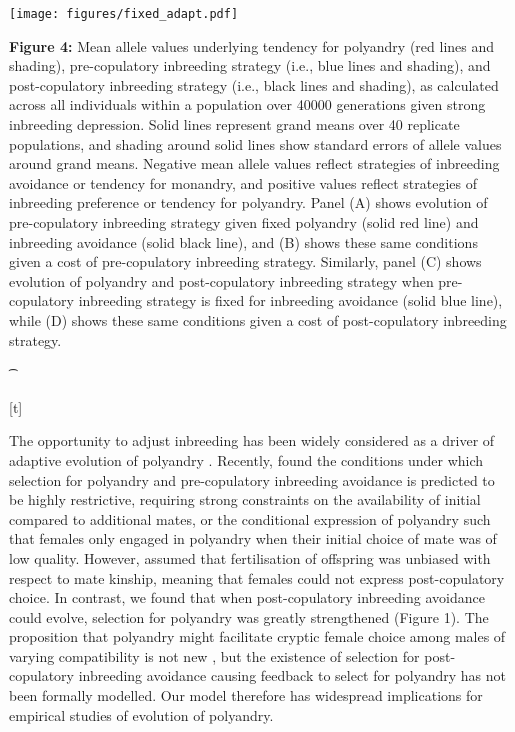 \documentclass[10pt,letterpaper]{article}
\begin{document}
{\color{Gray}
\begin{adjustwidth}{-2.2in}{0in}
{%
   \texttt{[image: figures/fixed\_adapt.pdf]}%
}%
{%
   \begin{justify}\vspace{0.25 mm} \textbf{Figure 4:} Mean allele values underlying tendency for polyandry (red lines and shading), pre-copulatory inbreeding strategy (i.e., blue lines and shading), and post-copulatory inbreeding strategy (i.e., black lines and shading), as calculated across all individuals within a population over 40000 generations given strong inbreeding depression. Solid lines represent grand means over 40 replicate populations, and shading around solid lines show standard errors of allele values around grand means. Negative mean allele values reflect strategies of inbreeding avoidance or tendency for monandry, and positive values reflect strategies of inbreeding preference or tendency for polyandry. Panel (A) shows evolution of pre-copulatory inbreeding strategy given fixed polyandry (solid red line) and inbreeding avoidance (solid black line), and (B) shows these same conditions given a cost of pre-copulatory inbreeding strategy. Similarly, panel (C) shows evolution of polyandry and post-copulatory inbreeding strategy when pre-copulatory inbreeding strategy is fixed for inbreeding avoidance (solid blue line), while (D) shows these same conditions given a cost of post-copulatory inbreeding strategy.\end{justify}{\t}%
}[t]
\end{adjustwidth}
}

The opportunity to adjust inbreeding has been widely considered as a driver of adaptive evolution of polyandry \cite[][]{Tregenza2002, Foerster2003, Akcay2007, Varian-Ramos2012, Kingma2013, Lehtonen2015, Reid2014}. Recently, \cite{Duthie} found the conditions under which selection for polyandry and pre-copulatory inbreeding avoidance is predicted to be highly restrictive, requiring strong constraints on the availability of initial compared to additional mates, or the conditional expression of polyandry such that females only engaged in polyandry when their initial choice of mate was of low quality. However, \cite{Duthie} assumed that fertilisation of offspring was unbiased with respect to mate kinship, meaning that females could not express post-copulatory choice. In contrast, we found that when post-copulatory inbreeding avoidance could evolve, selection for polyandry was greatly strengthened (Figure 1). The proposition that polyandry might facilitate cryptic female choice among males of varying compatibility is not new \cite[e.g.,][]{Zeh1997}, but the existence of selection for post-copulatory inbreeding avoidance causing feedback to select for polyandry has not been formally modelled. Our model therefore has widespread implications for empirical studies of evolution of polyandry. 
\end{document}
